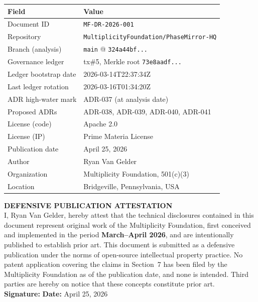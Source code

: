\documentclass[11pt,letterpaper]{article}
\theoremstyle{definition}
\theoremstyle{remark}
\begin{document}
\begin{center}
\begin{tabular}{ll}
\toprule
\textbf{Field} & \textbf{Value} \\
\midrule
Document ID           & \texttt{MF-DR-2026-001} \\
Repository            & \texttt{MultiplicityFoundation/PhaseMirror-HQ} \\
Branch (analysis)     & \texttt{main} @ \texttt{324a44bf...} \\
Governance ledger     & tx\#5, Merkle root \texttt{73e8aadf...} \\
Ledger bootstrap date & 2026-03-14T22:37:34Z \\
Last ledger rotation  & 2026-03-16T01:34:20Z \\
ADR high-water mark   & ADR-037 (at analysis date) \\
Proposed ADRs         & ADR-038, ADR-039, ADR-040, ADR-041 \\
License (code)        & Apache 2.0 \\
License (IP)          & Prime Materia License \\
Publication date      & April 25, 2026 \\
Author                & Ryan Van Gelder \\
Organization          & Multiplicity Foundation, 501(c)(3) \\
Location              & Bridgeville, Pennsylvania, USA \\
\bottomrule
\end{tabular}
\end{center}

\vspace{1em}
\begin{defensivebox}
\textbf{DEFENSIVE PUBLICATION ATTESTATION}\\[0.5em]
I, Ryan Van Gelder, hereby attest that the technical disclosures
contained in this document represent original work of the Multiplicity
Foundation, first conceived and implemented in the period
\textbf{March--April 2026}, and are intentionally published to
establish prior art. This document is submitted as a defensive
publication under the norms of open-source intellectual property
practice. No patent application covering the claims in Section~7
has been filed by the Multiplicity Foundation as of the publication
date, and none is intended. Third parties are hereby on notice that
these concepts constitute prior art.\\[0.5em]
\textbf{Signature:} \underline{\hspace{6cm}}
\quad \textbf{Date:} April 25, 2026
\end{defensivebox}
\end{document}
